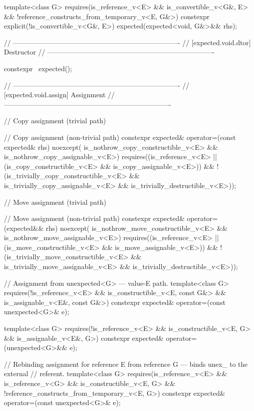 \begin{codeblock}
{{    template<class G>
      requires(is_reference_v<E> && is_convertible_v<G&, E> &&
               !reference_constructs_from_temporary_v<E, G&>)
    constexpr explicit(!is_convertible_v<G&, E>) expected(expected<void, G&>&& rhs);

    // -------------------------------------------------------------------------
    // [expected.void.dtor] Destructor
    // -------------------------------------------------------------------------

    constexpr ~expected();

    // -------------------------------------------------------------------------
    // [expected.void.assign] Assignment
    // -------------------------------------------------------------------------

    // Copy assignment (trivial path)

    // Copy assignment (non-trivial path)
    constexpr expected& operator=(const expected& rhs) noexcept(
        is_nothrow_copy_constructible_v<E> && is_nothrow_copy_assignable_v<E>)
      requires((is_reference_v<E> ||
                (is_copy_constructible_v<E> && is_copy_assignable_v<E>)) &&
               !(is_trivially_copy_constructible_v<E> &&
                 is_trivially_copy_assignable_v<E> && is_trivially_destructible_v<E>));

    // Move assignment (trivial path)

    // Move assignment (non-trivial path)
    constexpr expected& operator=(expected&& rhs) noexcept(
        is_nothrow_move_constructible_v<E> && is_nothrow_move_assignable_v<E>)
      requires((is_reference_v<E> ||
                (is_move_constructible_v<E> && is_move_assignable_v<E>)) &&
               !(is_trivially_move_constructible_v<E> &&
                 is_trivially_move_assignable_v<E> && is_trivially_destructible_v<E>));

    // Assignment from unexpected<G> — value-E path.
    template<class G>
      requires(!is_reference_v<E> && is_constructible_v<E, const G&> &&
               is_assignable_v<E&, const G&>)
    constexpr expected& operator=(const unexpected<G>& e);

    template<class G>
      requires(!is_reference_v<E> && is_constructible_v<E, G> && is_assignable_v<E&, G>)
    constexpr expected& operator=(unexpected<G>&& e);

    // Rebinding assignment for reference E from reference G — binds unex_ to the external
    // referent.
    template<class G>
      requires(is_reference_v<E> && is_reference_v<G> && is_constructible_v<E, G> &&
               !reference_constructs_from_temporary_v<E, G>)
    constexpr expected& operator=(const unexpected<G>& e);

}}
\end{codeblock}
